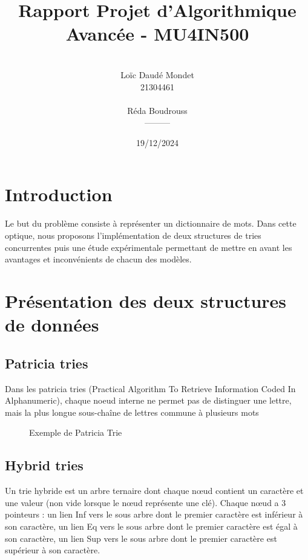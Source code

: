 \documentclass[11pt]{rapport-algav}
\begin{document}
\title{Rapport Projet d'Algorithmique Avancée - MU4IN500}


\author{
	\\Loïc Daudé Mondet
	\\21304461
	\\
	\\Réda Boudrouss
	\\---------
}

\date{19/12/2024}

\maketitle

\newpage
\tableofcontents
\newpage

\chapter{Introduction}
Le but du problème consiste à représenter un dictionnaire de mots. Dans cette optique, nous proposons l'implémentation de deux structures de tries concurrentes puis une étude expérimentale permettant de mettre en avant les avantages et inconvénients de chacun des modèles.

\vspace{5em}

\chapter{Présentation des deux structures de données}

\section{Patricia tries}
Dans les patricia tries (Practical Algorithm To Retrieve Information Coded In Alphanumeric), chaque noeud interne ne permet pas de distinguer une lettre, mais la plus longue sous-chaîne de lettres commune à plusieurs mots

\begin{figure}[ht!]
		\centering

		\caption{Exemple de Patricia Trie}
		\label{fig:Patricia_trie}
	\end{figure}


\newpage

\section{Hybrid tries}
Un trie hybride est un arbre ternaire dont chaque nœud contient un caractère et une valeur (non vide lorsque le nœud représente une clé).
Chaque nœud a 3 pointeurs : un lien Inf vers le sous arbre dont le premier caractère est inférieur à son caractère, un lien Eq vers le sous arbre dont le premier caractère est égal à son caractère, un lien Sup vers le sous arbre dont le premier caractère est supérieur à son caractère.
\end{document}
